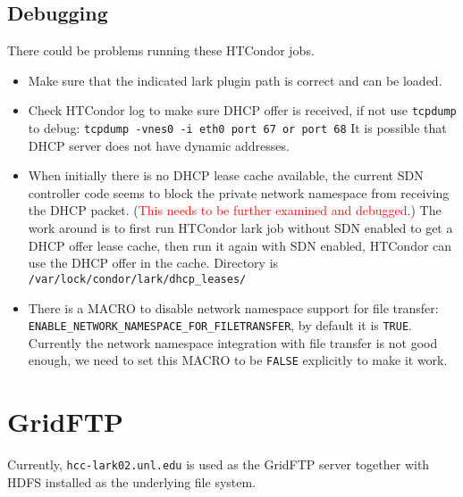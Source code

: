 \documentclass[a4paper]{article}
\begin{document}
\subsection{Debugging}
There could be problems running these HTCondor jobs.
\begin{itemize}
\item Make sure that the indicated lark plugin path is correct and can be loaded.
\item Check HTCondor log to make sure DHCP offer is received, if not use {\tt tcpdump} to debug: {
\tt tcpdump -vnes0 -i eth0 port 67 or port 68} It is possible that DHCP server does not have dynamic addresses.
\item When initially there is no DHCP lease cache available, the current SDN controller code seems to block the private network namespace from receiving the DHCP packet. (\textcolor{red}{This needs to be further examined and debugged}.) The work around is to first run HTCondor lark job without SDN enabled to get a DHCP offer lease cache, then run it again with SDN enabled, HTCondor can use the DHCP offer in the cache. Directory is {\tt /var/lock/condor/lark/dhcp\_leases/}
\item There is a MACRO to disable network namespace support for file transfer: {\tt ENABLE\_NETWORK\_NAMESPACE\_FOR\_FILETRANSFER}, by default it is {\tt TRUE}. Currently the network namespace integration with file transfer is not good enough, we need to set this MACRO to be {\tt FALSE} explicitly to make it work.
\end{itemize}
\section{GridFTP}
Currently, {\tt hcc-lark02.unl.edu} is used as the GridFTP server together with HDFS installed as the underlying file system.
\end{document}
